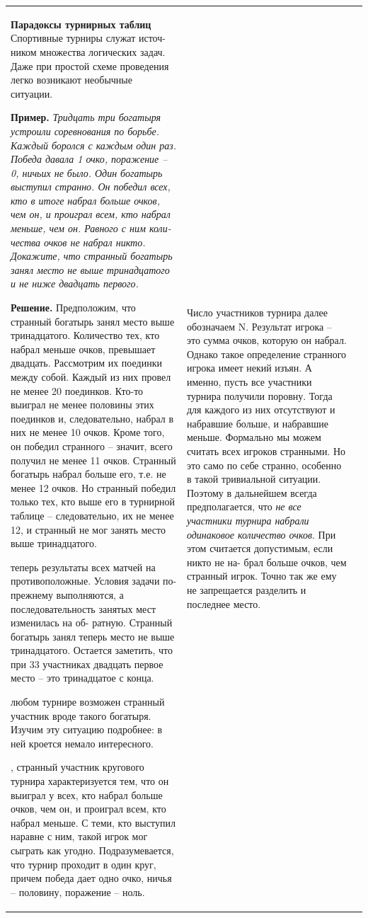 \documentclass[10pt,onecolumn,a4paper]{article}
\begin{document}
\begin{tabular}{  m{5.8cm}  m{5.6cm} m{7.2cm}}

\small{\textbf{Парадоксы турнирных таблиц}
Спортивные турниры служат источ- ником множества логических задач. Даже при простой схеме проведения легко возникают необычные ситуации.
    
    

\quad\textbf{Пример.} \textit{Тридцать три богатыря устроили соревнования по борьбе. Каждый боролся с каждым один раз. Победа давала 1 очко, поражение – 0, ничьих не было. Один богатырь выступил странно. Он победил всех, кто в итоге набрал больше очков, чем он, и проиграл всем, кто набрал меньше, чем он. Равного с ним коли- чества очков не набрал никто. Докажите, что странный богатырь занял место не выше тринадцатого и не ниже двадцать первого.}

\quad\textbf{Решение.} Предположим, что странный богатырь занял место выше тринадцатого. Количество тех, кто набрал меньше очков, превышает двадцать. Рассмотрим их поединки между собой. Каждый из них провел не менее 20 поединков. Кто-то выиграл не менее половины этих поединков и, следовательно, набрал в них не менее 10 очков. Кроме того, он победил странного – значит, всего получил не менее 11 очков. Странный богатырь набрал больше его, т.е. не менее 12 очков. Но странный победил только тех, кто выше его в турнирной таблице – следовательно, их не менее 12, и странный не мог занять место выше тринадцатого.

 теперь результаты всех матчей на противоположные. Условия задачи по-прежнему выполняются, а последовательность занятых мест изменилась на об- ратную. Странный богатырь занял теперь место не выше тринадцатого. Остается 
заметить, что при 33 участниках двадцать первое место – это тринадцатое с конца.

 любом турнире возможен странный участник вроде такого богатыря. Изучим эту ситуацию подробнее: в ней кроется немало интересного.

, странный участник кругового турнира характеризуется тем, что он выиграл у всех, кто набрал больше очков, чем он, и проиграл всем, кто набрал меньше. С теми, кто выступил наравне с ним, такой игрок мог сыграть как угодно. Подразумевается, что турнир проходит в один круг, причем победа дает одно очко, ничья – половину, поражение – ноль.}

&\small{Число участников турнира далее обозначаем N. Результат игрока – это сумма очков, которую он набрал.
Однако такое определение странного игрока имеет некий изъян. А именно, пусть все участники турнира получили поровну. Тогда для каждого из них отсутствуют и набравшие больше, и набравшие меньше. Формально мы можем считать всех игроков странными. Но это само по себе странно, особенно в такой тривиальной ситуации. Поэтому в дальнейшем всегда предполагается, что \textit{не все участники турнира набрали одинаковое количество очков}. При этом считается допустимым, если никто не на- брал больше очков, чем странный игрок. Точно так же ему не запрещается разделить и последнее место.

}
\end{tabular}
\end{document}
